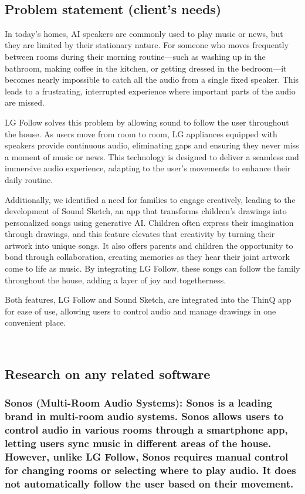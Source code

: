 \documentclass[conference]{IEEEtran}
\begin{document}
\
\
\
\subsection{Problem statement (client’s needs)}

In today’s homes, AI speakers are commonly used to play music or news, but they are limited by their stationary nature. For someone who moves frequently between rooms during their morning routine—such as washing up in the bathroom, making coffee in the kitchen, or getting dressed in the bedroom—it becomes nearly impossible to catch all the audio from a single fixed speaker. This leads to a frustrating, interrupted experience where important parts of the audio are missed.

LG Follow solves this problem by allowing sound to follow the user throughout the house. As users move from room to room, LG appliances equipped with speakers provide continuous audio, eliminating gaps and ensuring they never miss a moment of music or news. This technology is designed to deliver a seamless and immersive audio experience, adapting to the user's movements to enhance their daily routine.

Additionally, we identified a need for families to engage creatively, leading to the development of Sound Sketch, an app that transforms children's drawings into personalized songs using generative AI. Children often express their imagination through drawings, and this feature elevates that creativity by turning their artwork into unique songs. It also offers parents and children the opportunity to bond through collaboration, creating memories as they hear their joint artwork come to life as music. By integrating LG Follow, these songs can follow the family throughout the house, adding a layer of joy and togetherness.

Both features, LG Follow and Sound Sketch, are integrated into the ThinQ app for ease of use, allowing users to control audio and manage drawings in one convenient place.  

\ 
\subsection{Research on any related software}

\subsubsection{Sonos (Multi-Room Audio Systems): Sonos is a leading brand in multi-room audio systems. Sonos allows users to control audio in various rooms through a smartphone app, letting users sync music in different areas of the house. However, unlike LG Follow, Sonos requires manual control for changing rooms or selecting where to play audio. It does not automatically follow the user based on their movement.}
\
\end{document}
